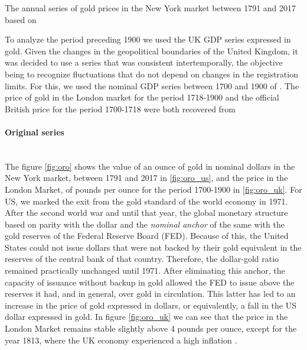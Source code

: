 \documentclass[a4paper,10cpi]{article}
\begin{document}
	
	The annual series of gold prices in the New York market between 1791 and 2017 based on \cite{officer2018gold}
	
	To analyze the period preceding 1900 we used the UK GDP series expressed in gold. Given the changes in the geopolitical boundaries of the United Kingdom, it was decided to use a series that was consistent intertemporally, the objective being to recognize fluctuations that do not depend on changes in the registration limits. For this, we used the nominal GDP series between 1700 and 1900 of \cite{Williamson2018uk}. The price of gold in the London market for the period 1718-1900 and the official British price for the period 1700-1718 were both recovered from \cite{officer2018gold}
	
	
	\paragraph{Original series}\mbox{}\\
	
	The figure \ref{fig:oro} shows the value of an ounce of gold in nominal dollars in the New York market, between 1791 and 2017 in \ref{fig:oro_us}, and the price in the London Market, of pounds per ounce for the period 1700-1900 in \ref{fig:oro_uk}. For US, we marked the exit from the gold standard of the world economy in 1971. After the second world war and until that year, the global monetary structure based on parity with the dollar and the \textit{nominal anchor} of the same with the gold reserves of the Federal Reserve Board (FED). Because of this, the United States could not issue dollars that were not backed by their gold equivalent in the reserves of the central bank of that country. Therefore, the dollar-gold ratio remained practically unchanged until 1971. After eliminating this anchor, the capacity of issuance without backup in gold allowed the FED to issue above the reserves it had, and in general, over gold in circulation. This latter has led to an increase in the price of gold expressed in dollars, or equivalently, a fall in the US dollar expressed in gold. In figure \ref{fig:oro_uk} we can see that the price in the London Market remains stable slightly above 4 pounds per ounce, except for the year 1813, where the UK economy experienced a high inflation \citep{silberling1919british}.
 	
\end{document}

